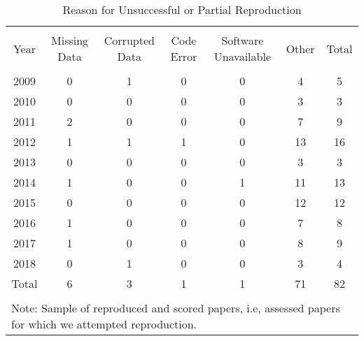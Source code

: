 
\begin{table}[!htbp] \centering 
  \caption{Reason for Unsuccessful or Partial Reproduction} 
  \label{tab:reason2} 
\footnotesize 
\begin{tabular}{@{\extracolsep{0.4pt}} ccccccc} 
\\[-1.8ex]\hline 
\hline \\[-1.8ex] 
Year & Missing Data & Corrupted Data & Code Error & Software Unavailable & Other & Total \\ 
\hline \\[-1.8ex] 
2009 & 0 & 1 & 0 & 0 & 4 & 5 \\ 
2010 & 0 & 0 & 0 & 0 & 3 & 3 \\ 
2011 & 2 & 0 & 0 & 0 & 7 & 9 \\ 
2012 & 1 & 1 & 1 & 0 & 13 & 16 \\ 
2013 & 0 & 0 & 0 & 0 & 3 & 3 \\ 
2014 & 1 & 0 & 0 & 1 & 11 & 13 \\ 
2015 & 0 & 0 & 0 & 0 & 12 & 12 \\ 
2016 & 1 & 0 & 0 & 0 & 7 & 8 \\ 
2017 & 1 & 0 & 0 & 0 & 8 & 9 \\ 
2018 & 0 & 1 & 0 & 0 & 3 & 4 \\ 
Total & 6 & 3 & 1 & 1 & 71 & 82 \\ 
\hline \\[-1.8ex] 
\multicolumn{7}{l}{Note: Sample of reproduced and scored papers, i.e, assessed papers for which we attempted reproduction.} \\ 
\end{tabular} 
\end{table} 
